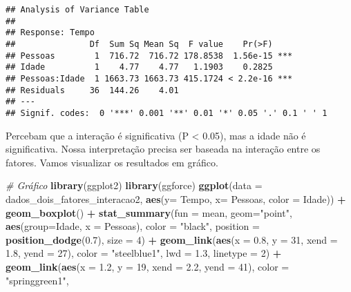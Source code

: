 \documentclass[
]{book}
\newenvironment{Shaded}{\begin{snugshade}}{\end{snugshade}}
\newcommand{\CommentTok}[1]{\textcolor[rgb]{0.56,0.35,0.01}{\textit{#1}}}
\newcommand{\DataTypeTok}[1]{\textcolor[rgb]{0.13,0.29,0.53}{#1}}
\newcommand{\DecValTok}[1]{\textcolor[rgb]{0.00,0.00,0.81}{#1}}
\newcommand{\FloatTok}[1]{\textcolor[rgb]{0.00,0.00,0.81}{#1}}
\newcommand{\KeywordTok}[1]{\textcolor[rgb]{0.13,0.29,0.53}{\textbf{#1}}}
\newcommand{\NormalTok}[1]{#1}
\newcommand{\OperatorTok}[1]{\textcolor[rgb]{0.81,0.36,0.00}{\textbf{#1}}}
\newcommand{\StringTok}[1]{\textcolor[rgb]{0.31,0.60,0.02}{#1}}
\begin{document}
\begin{verbatim}
## Analysis of Variance Table
## 
## Response: Tempo
##               Df  Sum Sq Mean Sq  F value    Pr(>F)    
## Pessoas        1  716.72  716.72 178.8538  1.56e-15 ***
## Idade          1    4.77    4.77   1.1903    0.2825    
## Pessoas:Idade  1 1663.73 1663.73 415.1724 < 2.2e-16 ***
## Residuals     36  144.26    4.01                       
## ---
## Signif. codes:  0 '***' 0.001 '**' 0.01 '*' 0.05 '.' 0.1 ' ' 1
\end{verbatim}

Percebam que a interação é significativa (P \textless{} 0.05), mas a idade não é significativa. Nossa interpretação precisa ser baseada na interação entre os fatores. Vamos visualizar os resultados em gráfico.

\begin{Shaded}
\begin{Highlighting}[]
\CommentTok{# Gráfico}
\KeywordTok{library}\NormalTok{(ggplot2)}
\KeywordTok{library}\NormalTok{(ggforce)}
\KeywordTok{ggplot}\NormalTok{(}\DataTypeTok{data =}\NormalTok{ dados_dois_fatores_interacao2, }\KeywordTok{aes}\NormalTok{(}\DataTypeTok{y=}\NormalTok{ Tempo, }\DataTypeTok{x=}\NormalTok{ Pessoas, }\DataTypeTok{color =}\NormalTok{ Idade)) }\OperatorTok{+}\StringTok{ }
\StringTok{  }\KeywordTok{geom_boxplot}\NormalTok{() }\OperatorTok{+}
\StringTok{  }\KeywordTok{stat_summary}\NormalTok{(}\DataTypeTok{fun =}\NormalTok{ mean, }\DataTypeTok{geom=}\StringTok{"point"}\NormalTok{, }\KeywordTok{aes}\NormalTok{(}\DataTypeTok{group=}\NormalTok{Idade, }\DataTypeTok{x =}\NormalTok{ Pessoas), }\DataTypeTok{color =} \StringTok{"black"}\NormalTok{,}
               \DataTypeTok{position =} \KeywordTok{position_dodge}\NormalTok{(}\FloatTok{0.7}\NormalTok{), }\DataTypeTok{size  =} \DecValTok{4}\NormalTok{) }\OperatorTok{+}
\StringTok{  }\KeywordTok{geom_link}\NormalTok{(}\KeywordTok{aes}\NormalTok{(}\DataTypeTok{x =} \FloatTok{0.8}\NormalTok{, }\DataTypeTok{y =} \DecValTok{31}\NormalTok{, }\DataTypeTok{xend =} \FloatTok{1.8}\NormalTok{, }\DataTypeTok{yend =} \DecValTok{27}\NormalTok{), }\DataTypeTok{color =} \StringTok{"steelblue1"}\NormalTok{, }
            \DataTypeTok{lwd  =} \FloatTok{1.3}\NormalTok{, }\DataTypeTok{linetype =} \DecValTok{2}\NormalTok{) }\OperatorTok{+}\StringTok{ }
\StringTok{  }\KeywordTok{geom_link}\NormalTok{(}\KeywordTok{aes}\NormalTok{(}\DataTypeTok{x =} \FloatTok{1.2}\NormalTok{, }\DataTypeTok{y =} \DecValTok{19}\NormalTok{, }\DataTypeTok{xend =} \FloatTok{2.2}\NormalTok{, }\DataTypeTok{yend =} \DecValTok{41}\NormalTok{), }\DataTypeTok{color =} \StringTok{"springgreen1"}\NormalTok{, }

\end{Highlighting}
\end{Shaded}
\end{document}
